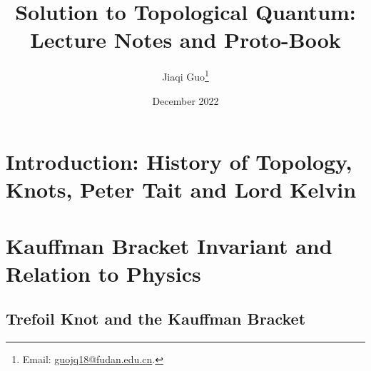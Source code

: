 \documentclass{book}
\title{Solution to Topological Quantum: Lecture Notes and Proto-Book}
\author{Jiaqi Guo\footnote{Email: \href{mailto:guojq18@fudan.edu.cn}{guojq18@fudan.edu.cn}.}}
\date{December 2022}
\begin{document}
\maketitle
\tableofcontents

\chapter{Introduction: History of Topology, Knots, Peter Tait and Lord Kelvin}

\chapter{Kauffman Bracket Invariant and Relation to Physics}
\section{Trefoil Knot and the Kauffman Bracket}
\end{document}
